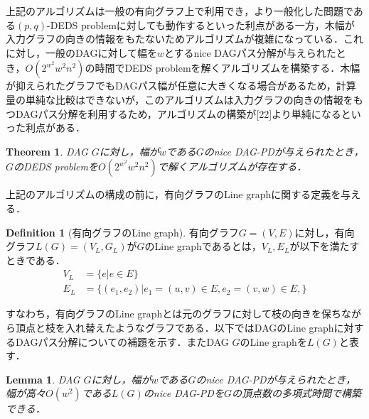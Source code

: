 \documentclass[master]{kuisthesis}		%
\theoremstyle{plain}
\newtheorem{theorem}{Theorem}
\newtheorem{lemma}{Lemma}
\theoremstyle{definition}
\newtheorem{definition*}{Definition}
\begin{document}
上記のアルゴリズムは一般の有向グラフ上で利用でき，より一般化した問題である$(p, q)$-DEDS problemに対しても動作するといった利点がある一方，木幅が入力グラフの向きの情報をもたないためアルゴリズムが複雑になっている．これに対し，一般のDAGに対して幅を$w$とするnice DAGパス分解が与えられたとき，$O(2^{w^2}w^2n^2)$の時間でDEDS problemを解くアルゴリズムを構築する．木幅が抑えられたグラフでもDAGパス幅が任意に大きくなる場合があるため，計算量の単純な比較はできないが，このアルゴリズムは入力グラフの向きの情報をもつDAGパス分解を利用するため，アルゴリズムの構築が[22]より単純になるといった利点がある．

\begin{theorem}\label{DEDS_FPT}
    DAG $G$に対し，幅が$w$である$G$のnice DAG-PDが与えられたとき，$G$のDEDS problemを$O(2^{w^2}w^2n^2)$で解くアルゴリズムが存在する．
\end{theorem}

上記のアルゴリズムの構成の前に，有向グラフのLine graphに関する定義を与える．

\begin{definition*}[有向グラフのLine graph]
    有向グラフ$G=(V, E)$に対し，有向グラフ$L(G)=(V_L, G_L)$が$G$のLine graphであるとは，$V_L, E_L$が以下を満たすときである．
    \begin{align*}
        V_L &= \{e | e\in E\}\\
        E_L &= \{(e_1, e_2) | e_1=(u, v)\in E, e_2=(v, w)\in E, \}
    \end{align*}
\end{definition*}

すなわち，有向グラフのLine graphとは元のグラフに対して枝の向きを保ちながら頂点と枝を入れ替えたようなグラフである．以下ではDAGのLine graphに対するDAGパス分解についての補題を示す．またDAG $G$のLine graphを$L(G)$と表す．

\begin{lemma}\label{DAG-PD(L(G))}
    DAG $G$に対し，幅が$w$である$G$のnice DAG-PDが与えられたとき，幅が高々$O(w^2)$である$L(G)$のnice DAG-PDを$G$の頂点数の多項式時間で構築できる．
\end{lemma}
\end{document}
